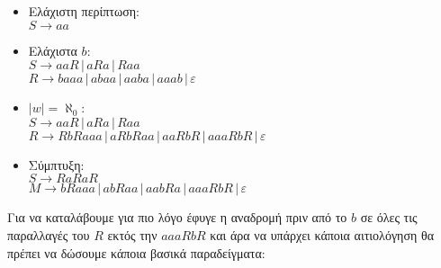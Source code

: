 \begin{itemize}
	\itemsep0em

	\item Ελάχιστη περίπτωση:\\\reducevspace
	$S \rightarrow aa$
\reducevspace\reducevspace\reducevspace\reducevspace\reducevspace\reducevspace\reducevspace
	\item Ελάχιστα $b$:\\\reducevspace
	$S \rightarrow aaR \,|\, aRa \,|\, Raa$\\\reducevspace
	$R \rightarrow baaa \,|\, abaa \,|\, aaba \,|\, aaab \,|\, \varepsilon$\\
\reducevspace\reducevspace\reducevspace\reducevspace\reducevspace\reducevspace\reducevspace
	\item $|w| = \aleph_0$:\\\reducevspace
	$S \rightarrow aaR \,|\, aRa \,|\, Raa$\\\reducevspace
	$R \rightarrow RbRaaa \,|\, aRbRaa \,|\, aaRbR \,|\, aaaRbR \,|\, \varepsilon$\\
\reducevspace\reducevspace\reducevspace\reducevspace\reducevspace\reducevspace\reducevspace
	\item Σύμπτυξη:\\\reducevspace
	$S \rightarrow RaRaR$\\\reducevspace
	$M \rightarrow bRaaa \,|\, abRaa \,|\, aabRa \,|\, aaaRbR \,|\, \varepsilon$\\
\end{itemize}

Για να καταλάβουμε για πιο λόγο έφυγε η αναδρομή πριν από το $b$ σε όλες τις παραλλαγές του $R$ εκτός την $aaaRbR$
και άρα να υπάρχει κάποια αιτιολόγηση θα πρέπει να δώσουμε κάποια βασικά παραδείγματα:\\

